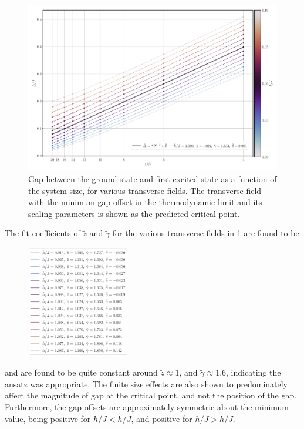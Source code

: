 \documentclass[12pt]{article}{}
\begin{document}
\begin{figure}[H]
  \centering
  \includegraphics[width=1\textwidth]{figures/ising/gap__N__h.pdf}
  \caption{Gap between the ground state and first excited state as a function of the system size, for various transverse fields. The transverse field with the minimum gap offset in the thermodynamic limit and its scaling parameters is shown as the predicted critical point.}
  \label{fig:ising_gap_N_h}
\end{figure}
  
The fit coefficients of $\tilde{z}$ and $\tilde{\gamma}$ for the various transverse fields in \cref{fig:ising_gap_N_h} are found to be
\begin{figure}[H]
  \centering
  \includegraphics[width=0.4\textwidth]{figures/ising/gap__N__h_legend.pdf}
  \label{fig:ising_gap_N_h_legend}
\end{figure}
and are found to be quite constant around $\tilde{z} \approx 1$, and $\tilde{\gamma} \approx 1.6$, indicating the ansatz was appropriate. The finite size effects are also shown to predominately affect the magnitude of gap at the critical point, and not the position of the gap. Furthermore, the gap offsets are approximately symmetric about the minimum value, being positive for $h/J< \tilde{h}/J$, and positive for $h/J > \tilde{h}/J$. 
\end{document}
